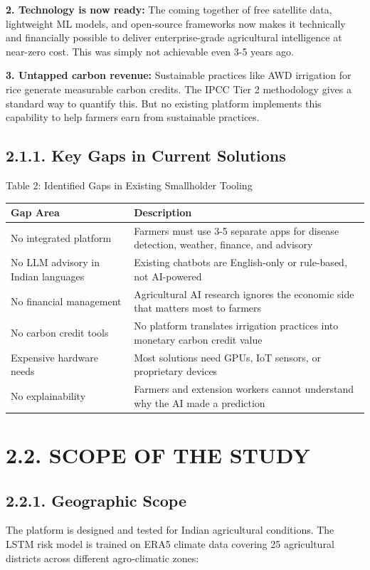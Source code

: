 \documentclass[12pt, a4paper]{report}
\begin{document}
\textbf{2. Technology is now ready:} The coming together of free satellite data, lightweight ML models, and open-source frameworks now makes it technically and financially possible to deliver enterprise-grade agricultural intelligence at near-zero cost. This was simply not achievable even 3-5 years ago.

\textbf{3. Untapped carbon revenue:} Sustainable practices like AWD irrigation for rice generate measurable carbon credits. The IPCC Tier 2 methodology gives a standard way to quantify this. But no existing platform implements this capability to help farmers earn from sustainable practices.

\subsection{2.1.1. Key Gaps in Current Solutions}
Table 2: Identified Gaps in Existing Smallholder Tooling

\begin{table}[htbp]
\centering
\small
\begin{tabularx}{\textwidth}{|X|X|}
\hline
Gap Area & Description \\
\hline
No integrated platform & Farmers must use 3-5 separate apps for disease detection, weather, finance, and advisory \\
No LLM advisory in Indian languages & Existing chatbots are English-only or rule-based, not AI-powered \\
No financial management & Agricultural AI research ignores the economic side that matters most to farmers \\
No carbon credit tools & No platform translates irrigation practices into monetary carbon credit value \\
Expensive hardware needs & Most solutions need GPUs, IoT sensors, or proprietary devices \\
No explainability & Farmers and extension workers cannot understand why the AI made a prediction \\
\hline
\end{tabularx}
\end{table}

\section{2.2. SCOPE OF THE STUDY}
\subsection{2.2.1. Geographic Scope}
The platform is designed and tested for Indian agricultural conditions. The LSTM risk model is trained on ERA5 climate data covering 25 agricultural districts across different agro-climatic zones:
\end{document}
